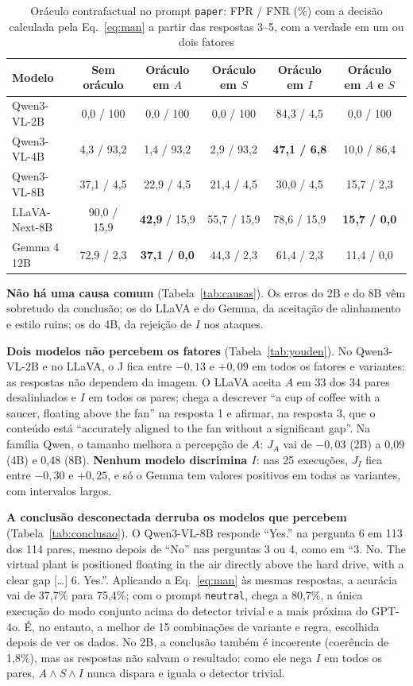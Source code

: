\documentclass[journal,onecolumn]{IEEEtran}
\begin{document}
\begin{table}[!t]
\renewcommand{\arraystretch}{1.15}
\caption{Oráculo contrafactual no prompt \texttt{paper}: FPR / FNR (\%) com a decisão calculada pela
Eq.~\eqref{eq:man} a partir das respostas 3--5, com a verdade em um ou dois fatores}
\label{tab:oraculo}
\centering
\footnotesize
\begin{tabular}{lccccc}
\toprule
Modelo & Sem oráculo & Oráculo em $A$ & Oráculo em $S$ & Oráculo em $I$ & Oráculo em $A$ e $S$ \\
\midrule
Qwen3-VL-2B   & 0,0 / 100  & 0,0 / 100  & 0,0 / 100  & 84,3 / 4,5 & 0,0 / 100 \\
Qwen3-VL-4B   & 4,3 / 93,2 & 1,4 / 93,2 & 2,9 / 93,2 & \textbf{47,1 / 6,8} & 10,0 / 86,4 \\
Qwen3-VL-8B   & 37,1 / 4,5 & 22,9 / 4,5 & 21,4 / 4,5 & 30,0 / 4,5 & 15,7 / 2,3 \\
LLaVA-Next-8B & 90,0 / 15,9 & \textbf{42,9} / 15,9 & 55,7 / 15,9 & 78,6 / 15,9 & \textbf{15,7 / 0,0} \\
Gemma 4 12B   & 72,9 / 2,3 & \textbf{37,1 / 0,0} & 44,3 / 2,3 & 61,4 / 2,3 & 11,4 / 0,0 \\
\bottomrule
\end{tabular}
\end{table}

\textbf{Não há uma causa comum} (Tabela~\ref{tab:causas}). Os erros do 2B e do 8B vêm sobretudo da
conclusão; os do LLaVA e do Gemma, da aceitação de alinhamento e estilo ruins; os do 4B, da rejeição de
$I$ nos ataques.

\textbf{Dois modelos não percebem os fatores} (Tabela~\ref{tab:youden}). No Qwen3-VL-2B e no LLaVA, o J
fica entre $-0{,}13$ e $+0{,}09$ em todos os fatores e variantes: as respostas não dependem da imagem.
O LLaVA aceita $A$ em 33 dos 34 pares desalinhados e $I$ em todos os pares; chega a descrever ``a cup
of coffee with a saucer, floating above the fan'' na resposta 1 e afirmar, na resposta 3, que o conteúdo
está ``accurately aligned to the fan without a significant gap''. Na família Qwen, o tamanho melhora a
percepção de $A$: $J_A$ vai de $-0{,}03$ (2B) a 0,09 (4B) e 0,48 (8B). \textbf{Nenhum modelo discrimina
$I$}: nas 25 execuções, $J_I$ fica entre $-0{,}30$ e $+0{,}25$, e só o Gemma tem valores positivos em
todas as variantes, com intervalos largos.

\textbf{A conclusão desconectada derruba os modelos que percebem} (Tabela~\ref{tab:conclusao}). O
Qwen3-VL-8B responde ``Yes.'' na pergunta 6 em 113 dos 114 pares, mesmo depois de ``No'' nas perguntas
3 ou 4, como em ``3. No. The virtual plant is positioned floating in the air directly above the hard
drive, with a clear gap [\dots] 6. Yes.''. Aplicando a Eq.~\eqref{eq:man} às mesmas respostas, a
acurácia vai de 37,7\% para 75,4\%; com o prompt \texttt{neutral}, chega a 80,7\%, a única execução do
modo conjunto acima do detector trivial e a mais próxima do GPT-4o. É, no entanto, a melhor de 15
combinações de variante e regra, escolhida depois de ver os dados. No 2B, a conclusão também é
incoerente (coerência de 1,8\%), mas as respostas não salvam o resultado: como ele nega $I$ em todos os
pares, $A\wedge S\wedge I$ nunca dispara e iguala o detector trivial.
\end{document}
